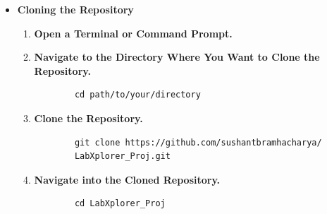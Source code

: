 \begin{itemize}
    \item \textbf{Cloning the Repository}
    \begin{enumerate}[label=\textbf{Step \arabic*:}]
        \item \textbf{Open a Terminal or Command Prompt.}
        \item \textbf{Navigate to the Directory Where You Want to Clone the Repository.}
        \begin{verbatim}
        cd path/to/your/directory
        \end{verbatim}
        \item \textbf{Clone the Repository.}
        \begin{verbatim}
        git clone https://github.com/sushantbramhacharya/
        LabXplorer_Proj.git
        \end{verbatim}
        \item \textbf{Navigate into the Cloned Repository.}
        \begin{verbatim}
        cd LabXplorer_Proj
        \end{verbatim}
    \end{enumerate}
    

\end{itemize}

